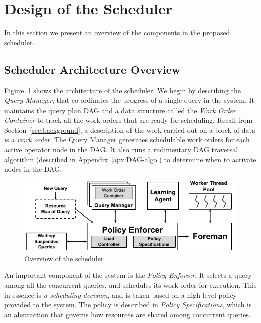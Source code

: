 \section{Design of the Scheduler}\label{sec:design}
In this section we present an overview of the components in the proposed \sys{} scheduler.

\subsection{Scheduler Architecture Overview}\label{ssec:scheduler-arch}
Figure~\ref{fig:scheduler-architecture} shows the architecture of the \sys{} scheduler.
We begin by describing the \textit{Query Manager}, that co-ordinates the progress of a single query in the system.
It maintains the query plan DAG and a data structure called
the \textit{Work Order Container} to track all the work orders that are ready for
scheduling. 
Recall from Section~\ref{sec:background}, a description of the work carried out on a block of data is a \textit{work order}. 
The Query Manager generates schedulable work orders for each active operator node in the DAG. 
It also runs a rudimentary DAG traversal algorithm (described in Appendix~\ref{apx:DAG-algo}) to determine when to activate nodes in the DAG. 

\begin{figure}[]
	\centering
	\includegraphics[width=\columnwidth]{figures/Scheduler-Architecture.pdf}
	\vspace*{-1.5em}
	\caption{Overview of the scheduler}
	\label{fig:scheduler-architecture}
	\vspace*{-1.5em}
\end{figure}

An important component of the system is the \textit{Policy Enforcer}.
It selects a query among all the concurrent queries, and schedules its work order for execution. 
This in essence is \textit{a scheduling decision}, and is taken based on a high-level policy provided to the system.
The policy is described in \textit{Policy Specifications}, which is an
abstraction that governs how resources are shared among concurrent queries. 

